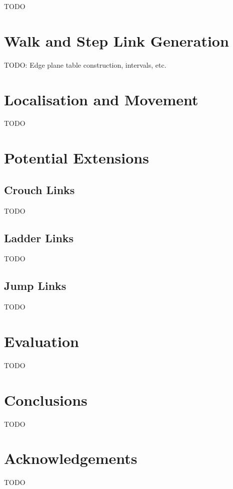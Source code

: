 \documentclass[12pt,onecolumn]{article}
\begin{document}
TODO

\section*{Walk and Step Link Generation}

TODO: Edge plane table construction, intervals, etc.

\section*{Localisation and Movement}

TODO

\section*{Potential Extensions}

\subsection*{Crouch Links}

TODO

\subsection*{Ladder Links}

TODO

\subsection*{Jump Links}

TODO

\section*{Evaluation}

TODO

\section*{Conclusions}

TODO

\section*{Acknowledgements}

TODO

\nocite{*}



\end{document}
